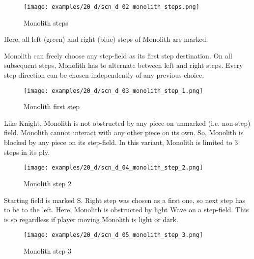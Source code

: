 \vspace*{6.1\baselineskip}
\noindent
\begin{wrapfigure}[9]{l}{0.35\textwidth}
\centering
\texttt{[image: examples/20\_d/scn\_d\_02\_monolith\_steps.png]}
\caption{Monolith steps}
\label{fig:scn_d_02_monolith_steps}
\end{wrapfigure}
Here, all left (green) and right (blue) steps of Monolith are marked.

Monolith can freely choose any step-field as its first step destination. On all
subsequent steps, Monolith has to alternate between left and right steps. Every
step direction can be chosen independently of any previous choice.

\noindent
\begin{wrapfigure}[9]{l}{0.35\textwidth}
\centering
\texttt{[image: examples/20\_d/scn\_d\_03\_monolith\_step\_1.png]}
\caption{Monolith first step}
\label{fig:scn_d_03_monolith_step_1}
\end{wrapfigure}
Like Knight, Monolith is not obstructed by any piece on unmarked (i.e. non-step)
field. Monolith cannot interact with any other piece on its own. So, Monolith is
blocked by any piece on its step-field. In this variant, Monolith is limited
to 3 steps in its ply.

\clearpage %

\noindent
\begin{figure}[!h]
\texttt{[image: examples/20\_d/scn\_d\_04\_monolith\_step\_2.png]}
\caption{Monolith step 2}
\label{fig:scn_d_04_monolith_step_2}
\end{figure}

Starting field is marked S. Right step was chosen as a first one, so next step
has to be to the left. Here, Monolith is obstructed by light Wave on a step-field.
This is so regardless if player moving Monolith is light or dark.

\clearpage %

\noindent
\begin{figure}[!h]
\texttt{[image: examples/20\_d/scn\_d\_05\_monolith\_step\_3.png]}
\caption{Monolith step 3}
\label{fig:scn_d_05_monolith_step_3}
\end{figure}

